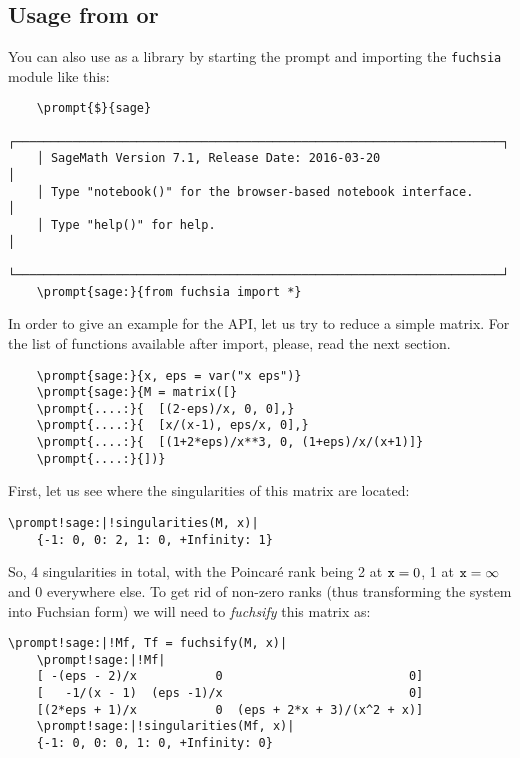 \documentclass[12pt,a4paper]{article}
\begin{document}
\subsection{Usage from \sage or \python}
\label{sec:usage_py}

You can also use \fuchsia as a library by starting the \sage prompt and importing the \texttt{fuchsia} module like this:

\begin{Verbatim}
    \prompt{$}{sage}
    ┌────────────────────────────────────────────────────────────────────┐
    │ SageMath Version 7.1, Release Date: 2016-03-20                     │
    │ Type "notebook()" for the browser-based notebook interface.        │
    │ Type "help()" for help.                                            │
    └────────────────────────────────────────────────────────────────────┘
    \prompt{sage:}{from fuchsia import *}
\end{Verbatim}

In order to give an example for the API, let us try to reduce a simple matrix.
For the list of functions available after import, please, read the next section.

\begin{Verbatim}
    \prompt{sage:}{x, eps = var("x eps")}
    \prompt{sage:}{M = matrix([}
    \prompt{....:}{  [(2-eps)/x, 0, 0],}
    \prompt{....:}{  [x/(x-1), eps/x, 0],}
    \prompt{....:}{  [(1+2*eps)/x**3, 0, (1+eps)/x/(x+1)]}
    \prompt{....:}{])}
\end{Verbatim}

First, let us see where the singularities of this matrix are located:

\begin{Verbatim}[commandchars=\\!|]
    \prompt!sage:|!singularities(M, x)|
    {-1: 0, 0: 2, 1: 0, +Infinity: 1}
\end{Verbatim}

So, 4 singularities in total, with the Poincar\'e rank being 2 at $\texttt{x}=0$, 1 at $\texttt{x}=\infty$ and 0 everywhere else.
To get rid of non-zero ranks (thus transforming the system into Fuchsian form) we will need to \textit{fuchsify} this matrix as:

\begin{Verbatim}[commandchars=\\!|]
    \prompt!sage:|!Mf, Tf = fuchsify(M, x)|
    \prompt!sage:|!Mf|
    [ -(eps - 2)/x           0                          0]
    [   -1/(x - 1)  (eps -1)/x                          0]
    [(2*eps + 1)/x           0  (eps + 2*x + 3)/(x^2 + x)]
    \prompt!sage:|!singularities(Mf, x)|
    {-1: 0, 0: 0, 1: 0, +Infinity: 0}
\end{Verbatim}
\end{document}

